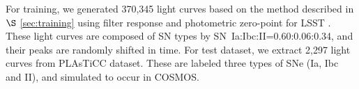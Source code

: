 \documentclass[useamsfonts]{pasj01}
\begin{document}

For training, we generated 370,345 light curves based on the method described in $\S$ \ref{sec:training} using filter response and photometric zero-point for LSST \citep{ivezic19a}.
These light curves are composed of SN types by SN~Ia:Ibc:II=0.60:0.06:0.34, and their peaks are randomly shifted in time.
%
For test dataset, we extract 2,297 light curves from PLAsTiCC dataset.
These are labeled three types of SNe (Ia, Ibc and II), and simulated to occur in COSMOS.
\end{document}
